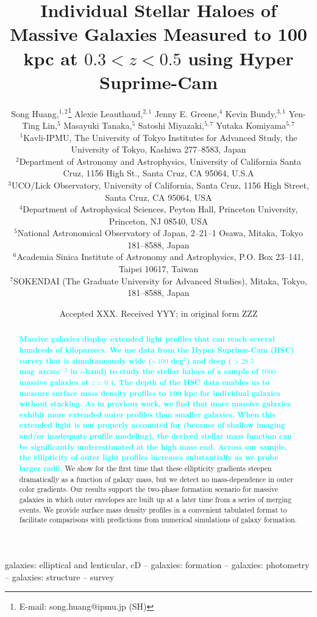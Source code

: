 \documentclass[fleqn,usenatbib]{mnras}
\title[Mass Dependent Stellar Haloes in Massive Galaxies]{Individual Stellar Haloes of 
	   Massive Galaxies Measured to 100 kpc at $0.3<z<0.5$ using Hyper Suprime-Cam}
\author[S. Huang et al.]{
        Song Huang,$^{1,2}$\thanks{E-mail: song.huang@ipmu.jp (SH)}
        Alexie Leauthaud,$^{2,1}$
        Jenny E. Greene,$^{4}$
        Kevin Bundy,$^{3,1}$
        \newauthor
        Yen-Ting Lin,$^{5}$
        Masayuki Tanaka,$^{5}$
        Satoshi Miyazaki,$^{5,7}$
        \newauthor
        Yutaka Komiyama$^{5,7}$
        \\
        $^{1}$Kavli-IPMU, The University of Tokyo Institutes for Advanced Study, 
              the University of Tokyo, Kashiwa 277--8583, Japan\\
        $^{2}$Department of Astronomy and Astrophysics, University of California 
              Santa Cruz, 1156 High St., Santa Cruz, CA 95064, U.S.A\\
        $^{3}$UCO/Lick Observatory, University of California, Santa Cruz,
              1156 High Street, Santa Cruz, CA 95064, USA\\
        $^{4}$Department of Astrophysical Sciences, Peyton Hall,
              Princeton University, Princeton, NJ 08540, USA \\
        $^{5}$National Astronomical Observatory of Japan, 2--21--1 Osawa, Mitaka, 
              Tokyo 181--8588, Japan\\
        $^{6}$Academia Sinica Institute of Astronomy and Astrophysics, 
              P.O. Box 23--141, Taipei 10617, Taiwan\\
        $^{7}$SOKENDAI (The Graduate University for Advanced Studies), Mitaka,
              Tokyo, 181--8588, Japan
        }
\date{Accepted XXX. Received YYY; in original form ZZZ}
\def\sb{mag~arcsec$^{-2}$}
\newcommand{\song}[1]{\textcolor{cyan}{\textbf{#1}}}
\begin{document}
\label{firstpage}
\pagerange{\pageref{firstpage}--\pageref{lastpage}}

\maketitle


\begin{abstract} 

    \song{
    Massive galaxies display extended light profiles that can reach several 
    hundreds of kiloparsecs. 
    We use data from the Hyper Suprime-Cam (HSC) survey that is simultaneously wide 
    (${\sim}100$ deg$^2$) and deep ($>28.5$ \sb{} in $i$-band) to study the stellar 
    haloes of a sample of $7000$ massive galaxies at $z=0.4$. 
    The depth of the HSC data enables us to measure surface mass density profiles 
    to 100 kpc for individual galaxies without stacking. 
    As in previous work, we find that more massive galaxies exhibit more extended outer 
    profiles than smaller galaxies.  
    When this extended light is not properly accounted for (because of shallow imaging 
    and/or inadequate profile modeling), the derived stellar mass function can be 
    significantly underestimated at the high mass end.  
    Across our sample, the ellipticity of outer light profiles increases substantially 
    as we probe larger radii.  
    }
    We show for the first time that these ellipticity gradients steepen dramatically as 
    a function of galaxy mass, but we detect no mass-dependence in outer color gradients. 
    Our results support the two-phase formation scenario for massive galaxies in which 
    outer envelopes are built up at a later time from a series of merging events. 
    We provide surface mass density profiles in a convenient tabulated format 
    to facilitate comparisons with predictions from numerical simulations of 
    galaxy formation.
    
\end{abstract}


\begin{keywords}
    galaxies: elliptical and lenticular, cD --
    galaxies: formation --
    galaxies: photometry -- 
    galaxies: structure -- 
    survey 
\end{keywords}

\end{document}
